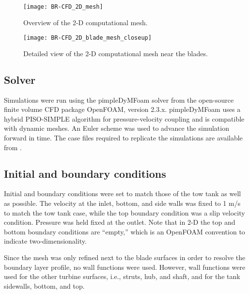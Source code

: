 \begin{figure}
    \centering

    \texttt{[image: BR-CFD\_2D\_mesh]}

    \caption{Overview of the 2-D computational mesh.}

    \label{fig:2d-br-mesh}
\end{figure}


\begin{figure}
    \centering

    \texttt{[image: BR-CFD\_2D\_blade\_mesh\_closeup]}

    \caption{Detailed view of the 2-D computational mesh near the blades.}

    \label{fig:blade-mesh}
\end{figure}


\subsection{Solver}

Simulations were run using the pimpleDyMFoam solver from the open-source finite
volume CFD package OpenFOAM, version 2.3.x. pimpleDyMFoam uses a hybrid
PISO-SIMPLE algorithm for pressure-velocity coupling and is compatible with
dynamic meshes. An Euler scheme was used to advance the simulation forward in
time. The case files required to replicate the simulations are available from
\cite{Bachant2016-UNH-RVAT-2D-OpenFOAM-SST, Bachant2016-UNH-RVAT-2D-OpenFOAM-SA,
Bachant2016-UNH-RVAT-3D-OpenFOAM-SST, Bachant2016-UNH-RVAT-3D-OpenFOAM-SA}.


\subsection{Initial and boundary conditions}

Initial and boundary conditions were set to match those of the tow tank as well
as possible. The velocity at the inlet, bottom, and side walls was fixed to 1
m/s to match the tow tank case, while the top boundary condition was a slip
velocity condition. Pressure was held fixed at the outlet. Note that in 2-D the
top and bottom boundary conditions are ``empty,'' which is an OpenFOAM
convention to indicate two-dimensionality.

Since the mesh was only refined next to the blade surfaces in order to resolve
the boundary layer profile, no wall functions were used. However, wall functions
were used for the other turbine surfaces, i.e., struts, hub, and shaft, and for
the tank sidewalls, bottom, and top.


